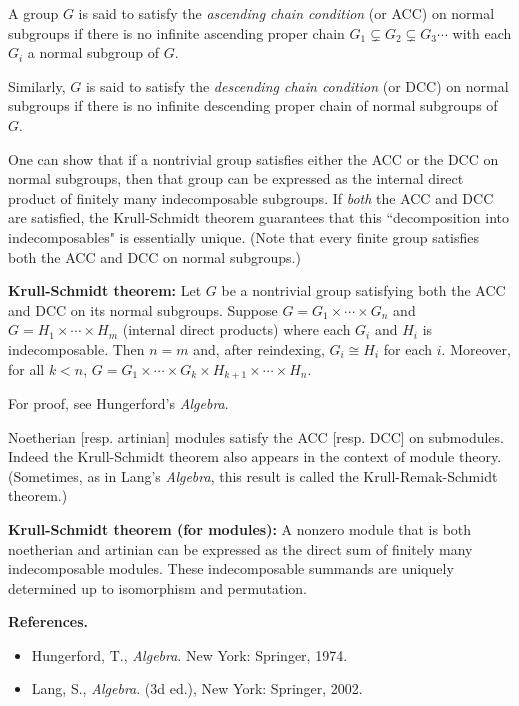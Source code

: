 \documentclass[12pt]{article}
\begin{document}

A group $G$ is said to satisfy the \emph{ascending chain condition} (or ACC) on normal subgroups if there is no infinite ascending proper chain
$G_1 \subsetneq G_2 \subsetneq G_3 \cdots$ with each $G_i$ a normal subgroup of $G$.

Similarly, $G$ is said to satisfy the \emph{descending chain condition} (or DCC) on normal subgroups if there is no infinite descending proper chain of normal subgroups of $G$.

One can show that if a nontrivial group satisfies either the ACC or the DCC on normal subgroups, then that group can be expressed as the internal direct product of finitely many indecomposable subgroups. If \emph{both} the ACC and DCC are satisfied, the Krull-Schmidt theorem guarantees that this ``decomposition into indecomposables" is essentially unique. (Note that every finite group satisfies both the ACC and DCC on normal subgroups.)

{\bf Krull-Schmidt theorem:} Let $G$ be a nontrivial group satisfying both the ACC and DCC on its normal subgroups. Suppose $G=G_1\times\cdots\times G_n$ and $G=H_1\times\cdots\times H_m$ (internal direct products) where each $G_i$ and $H_i$ is indecomposable. Then $n=m$ and, after reindexing, $G_i\cong H_i$ for each $i$. Moreover, for all $k<n$, $G=G_1\times\cdots\times G_k\times H_{k+1}\times\cdots\times H_n$.

For proof, see Hungerford's \emph{Algebra}.

Noetherian [resp. artinian] modules satisfy the ACC [resp. DCC] on submodules. Indeed the Krull-Schmidt theorem also appears in the context of module theory. (Sometimes, as in Lang's \emph{Algebra}, this result is called the Krull-Remak-Schmidt theorem.) 

{\bf Krull-Schmidt theorem (for modules):} A nonzero module that is both noetherian and artinian can be expressed as the direct sum of finitely many indecomposable modules. These indecomposable summands are uniquely determined up to isomorphism and permutation.



{\bf References.}
\begin{itemize}
\item Hungerford, T., \emph{Algebra}. New York: Springer, 1974.
\item Lang, S., \emph{Algebra}. (3d ed.), New York: Springer, 2002.
\end{itemize}
\end{document}

